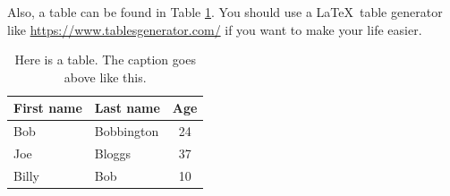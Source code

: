 Also, a table can be found in Table \ref{tbl:example-table}. You should use a \LaTeX~table generator like \url{https://www.tablesgenerator.com/} if you want to make your life easier.

\begin{table}[ht]
    \caption{Here is a table. The caption goes above like this.}
    \centering
    \begin{tabular}{l|l|c}
        First name & Last name & Age \\
        \hline\hline
        Bob & Bobbington & 24 \\
        Joe & Bloggs & 37 \\
        Billy & Bob & 10 \\

    \end{tabular}
    \label{tbl:example-table}
\end{table}